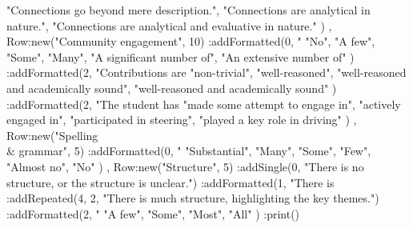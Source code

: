\documentclass{../../fal_assignment}
\begin{document}
\begin{luacode*}
{{					"Connections go beyond mere description.",
					"Connections are analytical in nature.",
					"Connections are analytical and evaluative in nature." })
			,
			Row:new("Community engagement", 10)
				:addFormatted(0, "%
					{ "No", "A few", "Some", "Many", "A significant number of", "An extensive number of" })
				:addFormatted(2, "Contributions are %
					{ "non-trivial", "well-reasoned",
						"well-reasoned and academically sound", "well-reasoned and academically sound" })
				:addFormatted(2, "The student has %
					{ "made some attempt to engage in", "actively engaged in",
						"participated in steering", "played a key role in driving" })
			,
			Row:new("Spelling \\& grammar", 5)
				:addFormatted(0, "%
					{ "Substantial", "Many", "Some", "Few", "Almost no", "No" })
			,
			Row:new("Structure", 5)
				:addSingle(0, "There is no structure, or the structure is unclear.")
				:addFormatted(1, "There is %
				:addRepeated(4, 2, "There is much structure, highlighting the key themes.")
				:addFormatted(2, "%
					{ "A few", "Some", "Most", "All" })
		}
		:print()
\end{luacode*}
\end{document}
